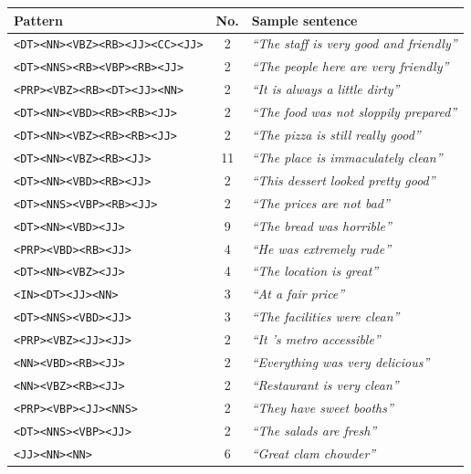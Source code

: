 \documentclass[a4paper,11pt]{kth-mag}
\begin{document}

\begin{table}[t]
  \centering
  \begin{tabular}{| l | c | l |}
    \hline
    \textbf{Pattern} &\textbf{No.} & \textbf{Sample sentence} \\ \hline
    \texttt{<DT><NN><VBZ><RB><JJ><CC><JJ>} & 2 & \emph{``The staff is very good and friendly''}\\
    \texttt{<DT><NNS><RB><VBP><RB><JJ>} & 2 & \emph{``The people here are very friendly''}\\
    \texttt{<PRP><VBZ><RB><DT><JJ><NN>} & 2 & \emph{``It is always a little dirty''}\\
    \texttt{<DT><NN><VBD><RB><RB><JJ>} & 2 & \emph{``The food was not sloppily prepared''}\\
    \texttt{<DT><NN><VBZ><RB><RB><JJ>} & 2 & \emph{``The pizza is still really good''}\\
    \texttt{<DT><NN><VBZ><RB><JJ>} & 11 & \emph{``The place is immaculately clean''}\\
    \texttt{<DT><NN><VBD><RB><JJ>} & 2 & \emph{``This dessert looked pretty good''}\\
    \texttt{<DT><NNS><VBP><RB><JJ>} & 2 & \emph{``The prices are not bad''}\\
    \texttt{<DT><NN><VBD><JJ>} & 9 & \emph{``The bread was horrible''}\\
    \texttt{<PRP><VBD><RB><JJ>} & 4 & \emph{``He was extremely rude''}\\
    \texttt{<DT><NN><VBZ><JJ>} & 4 & \emph{``The location is great''}\\
    \texttt{<IN><DT><JJ><NN>} & 3 & \emph{``At a fair price''}\\
    \texttt{<DT><NNS><VBD><JJ>} & 3 & \emph{``The facilities were clean''}\\
    \texttt{<PRP><VBZ><JJ><JJ>} & 2 & \emph{``It 's metro accessible''}\\
    \texttt{<NN><VBD><RB><JJ>} & 2 & \emph{``Everything was very delicious''}\\
    \texttt{<NN><VBZ><RB><JJ>} & 2 & \emph{``Restaurant is very clean''}\\
    \texttt{<PRP><VBP><JJ><NNS>} & 2 & \emph{``They have sweet booths''}\\
    \texttt{<DT><NNS><VBP><JJ>} & 2 & \emph{``The salads are fresh''}\\
    \texttt{<JJ><NN><NN>} & 6 & \emph{``Great clam chowder''}\\

\end{tabular}
\end{table}
\end{document}
